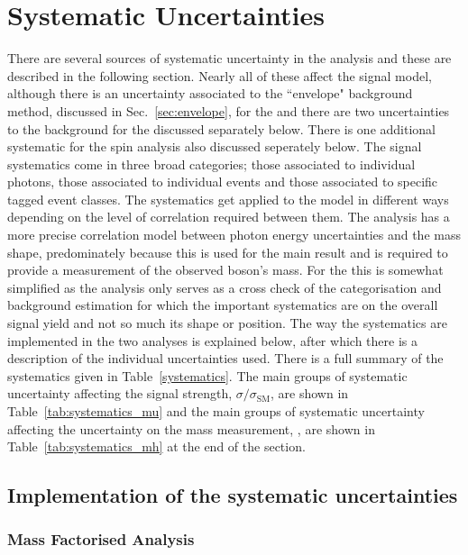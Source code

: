 \section{Systematic Uncertainties}
\label{sec:systematics}

There are several sources of systematic uncertainty in the analysis and these are described in the following section. Nearly all of these affect the signal model, although there is an uncertainty associated to the ``envelope" background method, discussed in Sec.~\ref{sec:envelope}, for the \MFM and there are two uncertainties to the background for the \SMVA discussed separately below. There is one additional systematic for the spin analysis also discussed seperately below. The signal systematics come in three broad categories; those associated to individual photons, those associated to individual events and those associated to specific tagged event classes. The systematics get applied to the model in different ways depending on the level of correlation required between them. The \MFM analysis has a more precise correlation model between photon energy uncertainties and the mass shape, predominately because this is used for the main result and is required to provide a measurement of the observed boson's mass. For the \SMVA this is somewhat simplified as the analysis only serves as a cross check of the categorisation and background estimation for which the important systematics are on the overall signal yield and not so much its shape or position. The way the systematics are implemented in the two analyses is explained below, after which there is a description of the individual uncertainties used. There is a full summary of the systematics given in Table~\ref{systematics}. The main groups of systematic uncertainty affecting the signal strength, $\sigma/\sigma_{\mathrm{SM}}$, are shown in Table~\ref{tab:systematics_mu} and the main groups of systematic uncertainty affecting the uncertainty on the mass measurement, \mH, are shown in Table~\ref{tab:systematics_mh} at the end of the section.

\subsection{Implementation of the systematic uncertainties}

\subsubsection{Mass Factorised Analysis}

